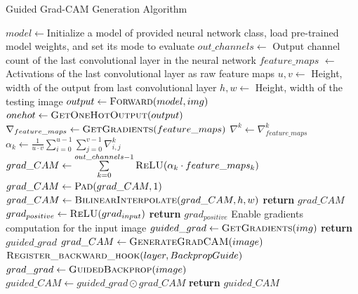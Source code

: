 \documentclass[12pt]{article}
\begin{document}
\begin{algorithm}[p]
\caption{Guided Grad-CAM Generation Algorithm}
\begin{algorithmic}[1]
\State $model\gets$Initialize a model of provided neural network class, load pre-trained model weights, and set its mode to evaluate
\State $out\_channels \gets$ Output channel count of the last convolutional layer in the neural network
\State $feature\_maps$ $\gets$ Activations of the last convolutional layer as raw feature maps
\State $u, v \gets$ Height, width of the output from last convolutional layer
\State $h, w \gets$ Height, width of the testing image
\State 
{}
    \State $output\gets \Call{Forward}{model,img}$ 
    \State $onehot\gets \Call{GetOneHotOutput}{output}$
    \State {} 
\EndProcedure
\State
{}
    \State {} 
    \State $\nabla_{feature\_maps} \gets \Call{GetGradients}{feature\_maps}$
        \State $\nabla^k \gets \nabla_{feature\_maps}^k$ 
        \State $\alpha_k \gets \frac{1}{u\cdot v}\sum\limits_{i=0}^{u-1}\sum\limits_{j=0}^{v-1}\nabla^k_{i,j}$ 
    \EndFor
    \State $grad\_CAM \gets \sum\limits_{k=0}^{out\_channels-1}\Call{ReLU}{\alpha_k\cdot feature\_maps_k}$
    \State $grad\_CAM \gets \Call{Pad}{grad\_CAM,1}$
    \State $grad\_CAM \gets \Call{BilinearInterpolate}{grad\_CAM, h, w}$
    \State {}
    \State \textbf{return} $grad\_CAM$
\EndProcedure
\State
{}
    \State $grad_{positive}\gets \Call{ReLU}{grad_{input}}$
    \State \textbf{return} $grad_{positive}$
\EndProcedure
\State
{}
    \State Enable gradients computation for the input image
    \State {} 
    \State $guided\_grad \gets \Call{GetGradients}{img}$
    \State \textbf{return} $guided\_grad$
\EndProcedure
\State
{}
    \State $grad\_CAM\gets\Call{GenerateGradCAM}{image}$
        \State $\Call{Register\_backward\_hook}{layer, BackpropGuide}$
    \EndFor
    \State $grad\_grad\gets\Call{GuidedBackprop}{image}$
    \State $guided\_CAM \gets guided\_grad \odot grad\_CAM$ 
    \State \textbf{return} $guided\_CAM$
\EndProcedure
\end{algorithmic}
\label{alg:alg}
\end{algorithm}
\end{document}
